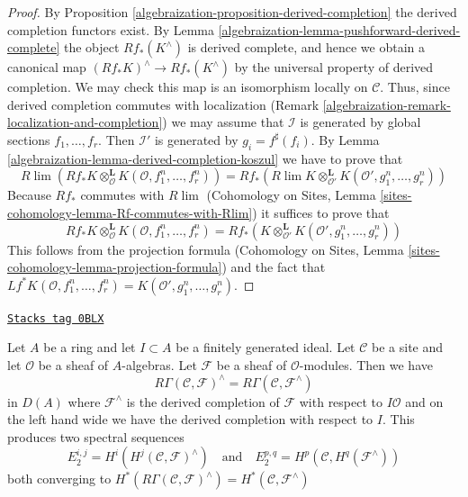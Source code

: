 \begin{proof}

By Proposition \ref{algebraization-proposition-derived-completion} the derived completion
functors exist. By Lemma \ref{algebraization-lemma-pushforward-derived-complete} the object
$Rf_*(K^\wedge)$ is derived complete, and hence we obtain a canonical map
$(Rf_*K)^\wedge \to Rf_*(K^\wedge)$ by the universal property of derived
completion. We may check this map is an isomorphism locally on $\mathcal{C}$.
Thus, since derived completion commutes with localization
(Remark \ref{algebraization-remark-localization-and-completion}) we may assume
that $\mathcal{I}$ is generated by global sections $f_1, \ldots, f_r$.
Then $\mathcal{I}'$ is generated by $g_i = f^\sharp(f_i)$. By
Lemma \ref{algebraization-lemma-derived-completion-koszul}
we have to prove that
$$
R\lim \left(
Rf_*K \otimes^\mathbf{L}_\mathcal{O} K(\mathcal{O}, f_1^n, \ldots, f_r^n)
\right)
=
Rf_*\left(
R\lim
K \otimes^\mathbf{L}_{\mathcal{O}'} K(\mathcal{O}', g_1^n, \ldots, g_r^n)
\right)
$$
Because $Rf_*$ commutes with $R\lim$
(Cohomology on Sites, Lemma
\ref{sites-cohomology-lemma-Rf-commutes-with-Rlim})
it suffices to prove that
$$
Rf_*K \otimes^\mathbf{L}_\mathcal{O} K(\mathcal{O}, f_1^n, \ldots, f_r^n) =
Rf_*\left(
K \otimes^\mathbf{L}_{\mathcal{O}'} K(\mathcal{O}', g_1^n, \ldots, g_r^n)
\right)
$$
This follows from the projection formula (Cohomology on Sites, Lemma
\ref{sites-cohomology-lemma-projection-formula}) and the fact that
$Lf^*K(\mathcal{O}, f_1^n, \ldots, f_r^n) =
K(\mathcal{O}', g_1^n, \ldots, g_r^n)$.
\end{proof}

\begin{lemma}
\label{algebraization-lemma-formal-functions-general}
\href{https://stacks.math.columbia.edu/tag/0BLX}{\texttt{Stacks tag 0BLX}}

Let $A$ be a ring and let $I \subset A$ be a finitely generated ideal.
Let $\mathcal{C}$ be a site and let $\mathcal{O}$ be a sheaf
of $A$-algebras. Let $\mathcal{F}$ be a sheaf of $\mathcal{O}$-modules.
Then we have
$$
R\Gamma(\mathcal{C}, \mathcal{F})^\wedge =
R\Gamma(\mathcal{C}, \mathcal{F}^\wedge)
$$
in $D(A)$ where $\mathcal{F}^\wedge$ is the derived
completion of $\mathcal{F}$ with respect to $I\mathcal{O}$ and on the
left hand wide we have the derived completion with respect to $I$.
This produces two spectral sequences
$$
E_2^{i, j} = H^i(H^j(\mathcal{C}, \mathcal{F})^\wedge)
\quad\text{and}\quad
E_2^{p, q} = H^p(\mathcal{C}, H^q(\mathcal{F}^\wedge))
$$
both converging to
$H^*(R\Gamma(\mathcal{C}, \mathcal{F})^\wedge) =
H^*(\mathcal{C}, \mathcal{F}^\wedge)$
\end{lemma}

